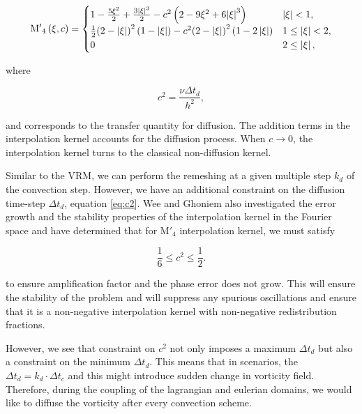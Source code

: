 \begin{equation}
{{{\rm{M'}}}_4}\left( {\xi ,c} \right) =
  \begin{cases}
   {1 - \frac{{5{\xi ^2}}}{2} + \frac{{3{{\left| \xi  \right|}^3}}}{2} - {c^2}\left( {2 - 9{\xi ^2} + 6{{\left| \xi  \right|}^3}} \right)} & {\left| \xi \right|} < 1, \\
   \frac{1}{2}{\left( {2 - \left| \xi  \right|} \right)^2}\left( {1 - \left| \xi  \right|} \right) - {c^2}{\left( {2 - \left| \xi  \right|} \right)^2}\left( {1 - 2\left| \xi  \right|} \right) & 1 \le {\left| \xi \right|} < 2,\\
   0 & 2 \le \left| \xi \right|,
  \end{cases}
\label{eq:modInterpKernel}
\end{equation}

where 

\begin{equation}
c^2 = \frac{\nu \Delta t_d}{h^2},
\label{eq:c2}
\end{equation}

and corresponds to the transfer quantity for diffusion. The addition terms in the interpolation kernel accounts for the diffusion process. When $c \rightarrow 0$, the interpolation kernel turns to the classical non-diffusion kernel. 

Similar to the VRM, we can perform the remeshing at a given multiple step $k_d$ of the convection step. However, we have an additional constraint on the diffusion time-step $\Delta t_d$, equation \ref{eq:c2}. Wee and Ghoniem \cite{Wee2006} also investigated the error growth and the stability properties of the interpolation kernel in the Fourier space and have determined that for $\mathrm{M'}_4$ interpolation kernel, we must satisfy

\begin{equation}
\frac{1}{6} \le c^2 \le \frac{1}{2}.
\label{eq:c2stability}
\end{equation}

to ensure amplification factor and the phase error does not grow. This will ensure the stability of the problem and will suppress any spurious oscillations and ensure that it is a non-negative interpolation kernel with non-negative redistribution fractions. 

However, we see that constraint on $c^2$ not only imposes a maximum $\Delta t_d$ but also a constraint on the minimum $\Delta t_d$. This means that in scenarios, the $\Delta t_d = k_d \cdot \Delta t_c$ and this might introduce sudden change in vorticity field. Therefore, during the coupling of the lagrangian and eulerian domains, we would like to diffuse the vorticity after every convection scheme.

